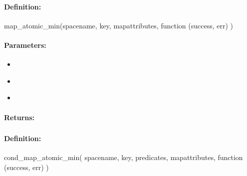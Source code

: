 \paragraph{Definition:}
\begin{javascriptcode}
map_atomic_min(spacename, key, mapattributes, function (success, err) {})
\end{javascriptcode}
\paragraph{Parameters:}
\begin{itemize}[noitemsep]
\item {}\\

\item {}\\

\item {}\\

\end{itemize}

\paragraph{Returns:}


\pagebreak
\subsubsection{}
\label{api:nodejs:cond_map_atomic_min}


\paragraph{Definition:}
\begin{javascriptcode}
cond_map_atomic_min(
        spacename, key, predicates, mapattributes, function (success, err) {})
\end{javascriptcode}
